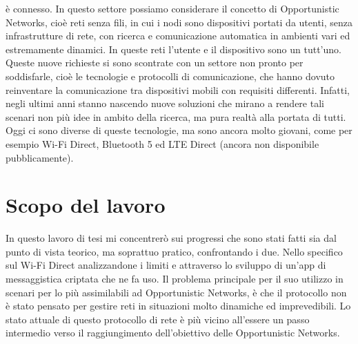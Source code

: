 è connesso. In questo settore possiamo considerare il concetto di Opportunistic
Networks, cioè reti senza fili, in cui i nodi sono dispositivi portati da utenti, senza
infrastrutture di rete, con ricerca e comunicazione automatica in ambienti vari ed
estremamente dinamici. In queste reti l’utente e il dispositivo sono un tutt’uno.
Queste nuove richieste si sono scontrate con un settore non pronto per soddisfarle,
cioè le tecnologie e protocolli di comunicazione, che hanno dovuto reinventare la
comunicazione tra dispositivi mobili con requisiti differenti. Infatti, negli ultimi anni
stanno nascendo nuove soluzioni che mirano a rendere tali scenari non più idee in
ambito della ricerca, ma pura realtà alla portata di tutti. Oggi ci sono diverse di
queste tecnologie, ma sono ancora molto giovani, come per esempio Wi-Fi Direct,
Bluetooth 5 ed LTE Direct (ancora non disponibile pubblicamente).


\section{Scopo del lavoro}

In questo lavoro di tesi mi concentrerò sui progressi 
che sono stati fatti sia dal punto di vista teorico,
ma soprattuo pratico, confrontando i due. 
Nello specifico sul Wi-Fi Direct analizzandone i limiti e attraverso lo sviluppo
di un'app di messaggistica criptata che ne fa uso.
Il problema principale per il suo utilizzo in scenari per lo
più assimilabili ad Opportunistic Networks, è che il protocollo non è stato pensato per
gestire reti in situazioni molto dinamiche ed imprevedibili. Lo stato attuale di questo
protocollo di rete è più vicino all’essere un passo intermedio verso il raggiungimento
dell’obiettivo delle Opportunistic Networks.


